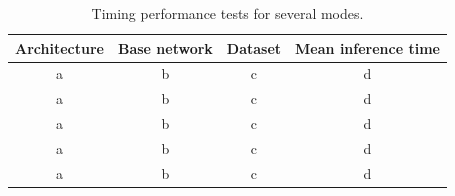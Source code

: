	
	
	
	\begin{table}[h]
		\centering
		\begin{tabular}{|c|c|c|c|}
			\hline
			\textbf{Architecture} & \textbf{Base network} & \textbf{Dataset} & \textbf{Mean inference time} \\ \hline
			a  & b  & c & d \\ \hline
			a  & b  & c & d \\ \hline
			a  & b  & c & d \\ \hline
			a  & b  & c & d \\ \hline
			a  & b  & c & d \\ \hline
		\end{tabular}
		\caption{Timing performance tests for several modes.}
		\label{tab:5_tests}
	\end{table}
		
	
	
	
	
	
	
	
	
	
	
	
	
	
	